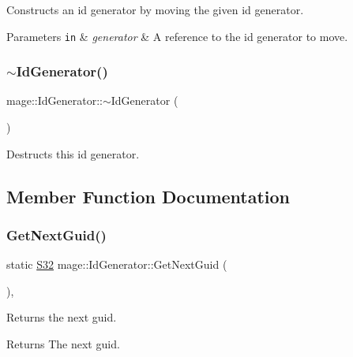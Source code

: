 Constructs an id generator by moving the given id generator.


\begin{DoxyParams}[1]{Parameters}
\mbox{\tt in}  & {\em generator} & A reference to the id generator to move. \\
\hline
\end{DoxyParams}
\hypertarget{classmage_1_1_id_generator_a70161ab5b10294ebba1ace7a3b0f8d31}{}\label{classmage_1_1_id_generator_a70161ab5b10294ebba1ace7a3b0f8d31} 
\subsubsection{\texorpdfstring{$\sim$\+Id\+Generator()}{~IdGenerator()}}
{\footnotesize\ttfamily mage\+::\+Id\+Generator\+::$\sim$\+Id\+Generator (\begin{DoxyParamCaption}{ }\end{DoxyParamCaption})\hspace{0.3cm}{\ttfamily [default]}}

Destructs this id generator. 

\subsection{Member Function Documentation}
\hypertarget{classmage_1_1_id_generator_a61c706df62168d306c47b79aed4b2e07}{}\label{classmage_1_1_id_generator_a61c706df62168d306c47b79aed4b2e07} 
\subsubsection{\texorpdfstring{Get\+Next\+Guid()}{GetNextGuid()}}
{\footnotesize\ttfamily static \hyperlink{namespacemage_a642e05c5c83642b6946703615cdbf2da}{S32} mage\+::\+Id\+Generator\+::\+Get\+Next\+Guid (\begin{DoxyParamCaption}{ }\end{DoxyParamCaption})\hspace{0.3cm}{\ttfamily [static]}, {\ttfamily [noexcept]}}

Returns the next guid.

\begin{DoxyReturn}{Returns}
The next guid. 
\end{DoxyReturn}
\hypertarget{classmage_1_1_id_generator_a9e0e86e5feab919f5ac5ab4ad8f51b09}{}\label{classmage_1_1_id_generator_a9e0e86e5feab919f5ac5ab4ad8f51b09} 
